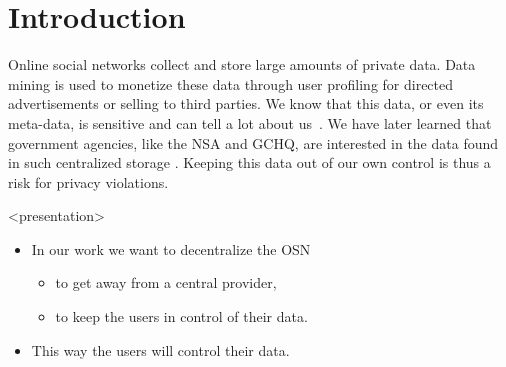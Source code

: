 \acresetall{}
\section{Introduction}
%


Online social networks collect and store large amounts of private data.
Data mining is used to monetize these data through user profiling for directed 
advertisements or selling to third parties.
We know that this data, or even its meta-data, is sensitive and can tell a lot 
about us~\cite[e.g.][]{pregnancy}.
We have later learned that government agencies, like the \ac{NSA} and 
\ac{GCHQ}, are interested in the data found in such centralized storage 
\cite{prism}.
Keeping this data out of our own control is thus a risk for privacy violations.

\begin{frame}<presentation>
  \begin{itemize}

    \item In our work we want to decentralize the \ac{OSN}
      \begin{itemize}
        \item to get away from a central provider,
        \item to keep the users in control of their data.
      \end{itemize}

    \item This way the users will control their data.


  \end{itemize}
\end{frame}

